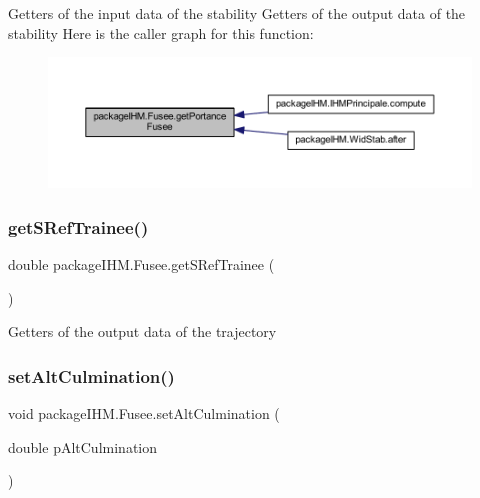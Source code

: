 Getters of the input data of the stability Getters of the output data of the stability Here is the caller graph for this function\+:
\nopagebreak
\begin{figure}[H]
\begin{center}
\leavevmode
\includegraphics[width=350pt]{classpackage_i_h_m_1_1_fusee_afc0492c0c663001bd7a0369842e988ba_icgraph}
\end{center}
\end{figure}
\mbox{\label{classpackage_i_h_m_1_1_fusee_a86af3645420069b63f9ebfdae4ec7895}} 
\subsubsection{\texorpdfstring{get\+S\+Ref\+Trainee()}{getSRefTrainee()}}
{\footnotesize\ttfamily double package\+I\+H\+M.\+Fusee.\+get\+S\+Ref\+Trainee (\begin{DoxyParamCaption}{ }\end{DoxyParamCaption})}

Getters of the output data of the trajectory \mbox{\label{classpackage_i_h_m_1_1_fusee_a267ec95b3ae1a0746cb8f44f3fa7492c}} 
\subsubsection{\texorpdfstring{set\+Alt\+Culmination()}{setAltCulmination()}}
{\footnotesize\ttfamily void package\+I\+H\+M.\+Fusee.\+set\+Alt\+Culmination (\begin{DoxyParamCaption}\item[{double}]{p\+Alt\+Culmination }\end{DoxyParamCaption})}


